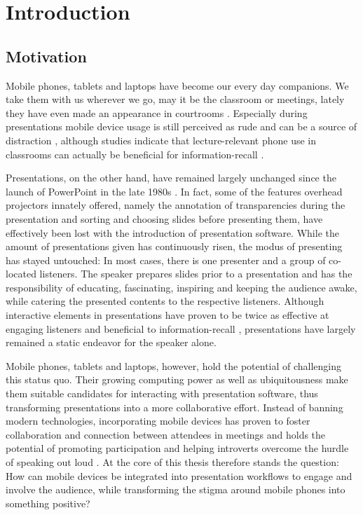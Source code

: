 \chapter{Introduction}
\label{cha:introduction}

\section{Motivation}

Mobile phones, tablets and laptops have become our every day companions. We take them with us wherever we go, may it be the classroom or meetings, lately they have even made an appearance in courtrooms \cite{Farrell:TrialByTablet}. Especially during presentations mobile device usage is still perceived as rude and can be a source of distraction \cite{Bohmer:SmartphoneUseRude, Bajko:ComparativePerceptionSmartphoneMeeting, Kuznekoff:ImpactPhoneStudentLearning}, although studies indicate that lecture-relevant phone use in classrooms can actually be beneficial for information-recall \cite{Kuznekoff:MobilePhoneClassroomTwitter}.

Presentations, on the other hand, have remained largely unchanged since the launch of PowerPoint in the late 1980s \cite{Yates:PowerPoint}. In fact, some of the features overhead projectors innately offered, namely the annotation of transparencies during the presentation and sorting and choosing slides before presenting them, have effectively been lost with the introduction of presentation software. While the amount of presentations given has continuously risen, the modus of presenting has stayed untouched: In most cases, there is one presenter and a group of co-located listeners. The speaker prepares slides prior to a presentation and has the responsibility of educating, fascinating, inspiring and keeping the audience awake, while catering the presented contents to the respective listeners. Although interactive elements in presentations have proven to be twice as effective at engaging listeners and beneficial to information-recall \cite{prezi-science}, presentations have largely remained a static endeavor for the speaker alone.

Mobile phones, tablets and laptops, however, hold the potential of challenging this status quo. Their growing computing power as well as ubiquitousness make them suitable candidates for interacting with presentation software, thus transforming presentations into a more collaborative effort. Instead of banning modern technologies, incorporating mobile devices has proven to foster collaboration and connection between attendees in meetings \cite{Bohmer:SmartphoneUseRude} and holds the potential of promoting participation and helping introverts overcome the hurdle of speaking out loud \cite{Bry:Backstage}. At the core of this thesis therefore stands the question: How can mobile devices be integrated into presentation workflows to engage and involve the audience, while transforming the stigma around mobile phones into something positive?

